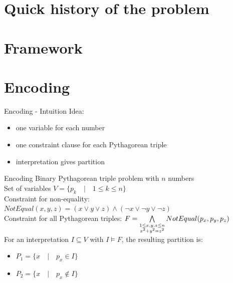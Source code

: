 \documentclass[c,8pt,xcolor...,x11names,usenames,dvipsnames]{beamer}
\begin{document}
\section{Quick history of the problem}


\section{Framework}


\section{Encoding}

\begin{frame}{Encoding - Intuition}
	Idea:
	\begin{itemize}
		\item one variable for each number
		\pause
		\item one constraint clause for each Pythagorean triple
		\pause
		\item interpretation gives partition
	\end{itemize}
\end{frame}

\begin{frame}{Encoding}
	Binary Pythagorean triple problem with $n$ numbers \\
	\vspace{5px}
	\pause
	Set of variables $V = \{ p_k \quad | \quad 1 \leq k \leq n \}$ \\
	\vspace{5px}
	\pause
	Constraint for non-equality: $NotEqual(x,y,z) = (x \vee y \vee z) \wedge (\neg x \vee \neg y \vee \neg z) $ \\
	\vspace{5px}
	\pause
	Constraint for all Pythagorean triples: $F = \bigwedge\limits_{\small\substack{1 \leq x,y,z \leq n \\ x^2+y^2=z^2}} NotEqual(p_x,p_y,p_z)$ \\
	\vspace{10px}
	\pause
	For an interpretation $I \subseteq V$ with $I \models F$, the resulting partition is:
	\begin{itemize}
		\item $ P_1 = \{ x \quad | \quad p_x \in I \}$
		\item $ P_2 = \{ x \quad | \quad p_x \notin I \} $
	\end{itemize}
\end{frame}
\end{document}
